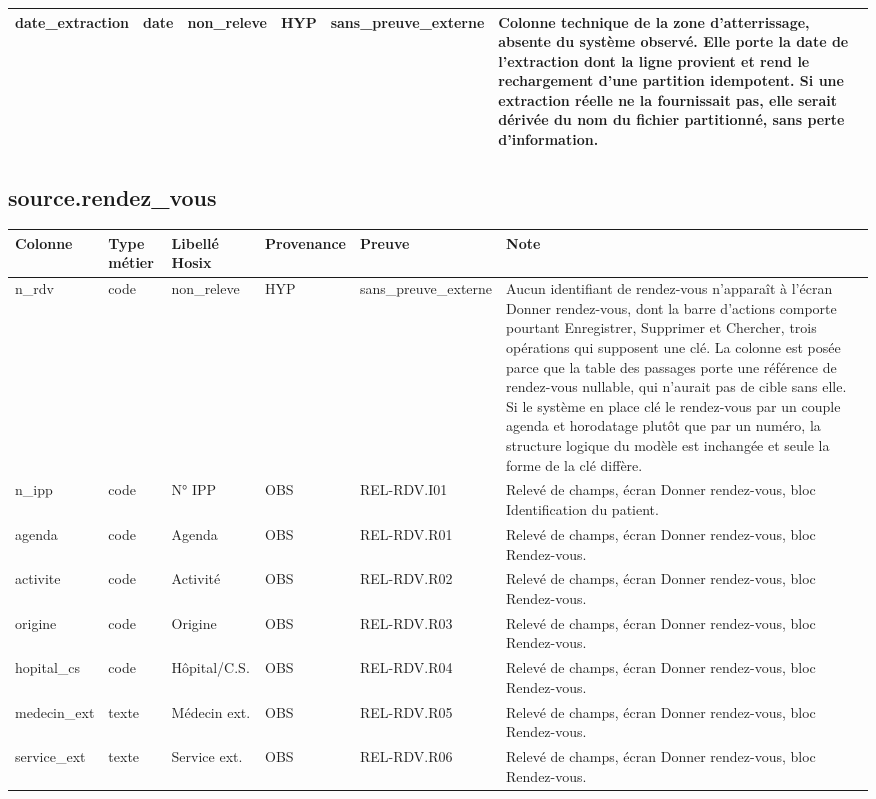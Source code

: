 \begin{longtable}{p{2.5cm}p{1.8cm}p{2.8cm}p{1.3cm}p{2.2cm}p{5cm}}
date\_extraction & date & non\_releve & HYP & sans\_preuve\_externe & Colonne technique de la zone d'atterrissage, absente du système observé. Elle porte la date de l'extraction dont la ligne provient et rend le rechargement d'une partition idempotent. Si une extraction réelle ne la fournissait pas, elle serait dérivée du nom du fichier partitionné, sans perte d'information. \\
\hline
\end{longtable}

\subsection*{source.rendez\_vous}
\begin{longtable}{p{2.5cm}p{1.8cm}p{2.8cm}p{1.3cm}p{2.2cm}p{5cm}}
\hline
Colonne & Type métier & Libellé Hosix & Provenance & Preuve & Note \\
\hline
\endhead
n\_rdv & code & non\_releve & HYP & sans\_preuve\_externe & Aucun identifiant de rendez-vous n'apparaît à l'écran Donner rendez-vous, dont la barre d'actions comporte pourtant Enregistrer, Supprimer et Chercher, trois opérations qui supposent une clé. La colonne est posée parce que la table des passages porte une référence de rendez-vous nullable, qui n'aurait pas de cible sans elle. Si le système en place clé le rendez-vous par un couple agenda et horodatage plutôt que par un numéro, la structure logique du modèle est inchangée et seule la forme de la clé diffère. \\
n\_ipp & code & N° IPP & OBS & REL-RDV.I01 & Relevé de champs, écran Donner rendez-vous, bloc Identification du patient. \\
agenda & code & Agenda & OBS & REL-RDV.R01 & Relevé de champs, écran Donner rendez-vous, bloc Rendez-vous. \\
activite & code & Activité & OBS & REL-RDV.R02 & Relevé de champs, écran Donner rendez-vous, bloc Rendez-vous. \\
origine & code & Origine & OBS & REL-RDV.R03 & Relevé de champs, écran Donner rendez-vous, bloc Rendez-vous. \\
hopital\_cs & code & Hôpital/C.S. & OBS & REL-RDV.R04 & Relevé de champs, écran Donner rendez-vous, bloc Rendez-vous. \\
medecin\_ext & texte & Médecin ext. & OBS & REL-RDV.R05 & Relevé de champs, écran Donner rendez-vous, bloc Rendez-vous. \\
service\_ext & texte & Service ext. & OBS & REL-RDV.R06 & Relevé de champs, écran Donner rendez-vous, bloc Rendez-vous. \\

\end{longtable}
